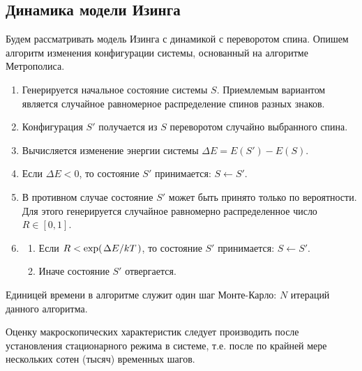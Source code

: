 \documentclass[12pt,a4paper]{article}
\begin{document}

        \subsection{Динамика модели Изинга}

            Будем рассматривать модель Изинга с динамикой с переворотом спина. Опишем алгоритм изменения конфигурации системы, основанный на алгоритме Метрополиса.
            \begin{enumerate}[nosep]
                \item Генерируется начальное состояние системы $S$. Приемлемым вариантом является случайное равномерное распределение спинов разных знаков.
                \item Конфигурация $S'$ получается из $S$ переворотом случайно выбранного спина.
                \item Вычисляется изменение энергии системы $\Delta E = E(S') - E(S)$.
                \item Если $\Delta E < 0$, то состояние $S'$ принимается: $S \longleftarrow S'$.
                \item В противном случае состояние $S'$ может быть принято только по вероятности. Для этого генерируется случайное равномерно распределенное число $R \in [0,1]$.
                \item \begin{enumerate}
                    \item Если $R < \exp(\flatfrac{\Delta E}{kT})$, то состояние $S'$ принимается: $S \longleftarrow S'$.
                    \item Иначе состояние $S'$ отвергается.
                \end{enumerate}
            \end{enumerate}
            Единицей времени в алгоритме служит один шаг Монте-Карло: $N$ итераций данного алгоритма.

            Оценку макроскопических характеристик следует производить после установления стационарного режима в системе, т.е. после по крайней мере нескольких сотен (тысяч) временных шагов.

\end{document}

